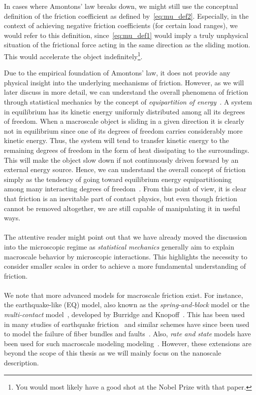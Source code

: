 In cases where Amontons' law breaks down, we might still use the conceptual
definition of the friction coefficient as defined by~\cref{eq:mu_def2}.
Especially, in the context of achieving negative friction coefficients (for certain load ranges), we would refer to this definition, since~\cref{eq:mu_def1}
would imply a truly unphysical situation of the frictional force acting in the
same direction as the sliding motion. This would accelerate the object
indefinitely\footnote{You would most likely have a good shot at the Nobel Prize
with that paper.}.

Due to the empirical foundation of Amontons’ law, it does not provide any
physical insight into the underlying mechanisms of friction. However, as we will
later discuss in more detail, we can understand the overall phenomena of
friction through statistical mechanics by the concept of \textit{equipartition
of energy}~\cite{Manini_2016}. A system in equilibrium has its kinetic energy
uniformly distributed among all its degrees of freedom. When a macroscale object
is sliding in a given direction it is clearly not in equilibrium since one of
its degrees of freedom carries considerably more kinetic energy. Thus, the
system will tend to transfer kinetic energy to the remaining
degrees of freedom in the form of heat dissipating to the surroundings. This will make the object slow down if not continuously driven forward by an external energy source. Hence, we can understand the overall concept of friction simply
as the tendency of going toward equilibrium energy equipartitioning among many
interacting degrees of freedom~\cite{Manini_2016}. From this point of view, it is
clear that friction is an inevitable part of contact physics, but even though
friction cannot be removed altogether, we are still capable of manipulating it
in useful ways. \\
\\
The attentive reader might point out that we have already moved the discussion
into the microscopic regime as \textit{statistical mechanics} generally
aim to explain macroscale behavior by microscopic interactions. This 
highlights the necessity to consider smaller scales in order to achieve a more fundamental understanding of friction.
\\
\\
We note that more advanced models for macroscale friction exist. For instance, the earthquake-like (EQ) model, also known as the \textit{spring-and-block} model or the \textit{multi-contact} model~\cite{Manini_2016}, developed by Burridge and Knopoff~\cite{Burridge_1967}. This has been used in many studies of earthquake friction~\cite{PhysRevLett.88.096102} and similar schemes have since been used to model the failure of fiber bundles and faults~\cite{newman_failure_1991, Smalley_1985}. Also, \textit{rate and state} models have been used for such macroscale modeling modeling~\cite{SELVADURAI2023229689}. However, these extensions are beyond the scope of this thesis as we will mainly focus on the nanoscale description. 



